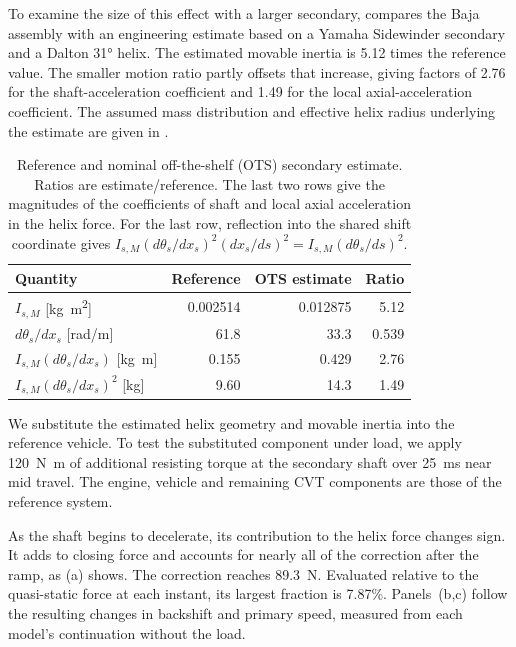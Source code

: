 \documentclass[11pt]{report}
\numberwithin{equation}{section}
\begin{document}
To examine the size of this effect with a larger secondary,
 compares the Baja assembly with an
engineering estimate based on a Yamaha Sidewinder secondary and a Dalton
\ang{31} helix. The estimated movable inertia is \num{5.12} times the
reference value. The smaller motion ratio partly offsets that increase,
giving factors of \num{2.76} for the shaft-acceleration coefficient and
\num{1.49} for the local axial-acceleration coefficient. The assumed mass
distribution and effective helix radius underlying the estimate are given
in .

\begin{table}[H]
 \centering\small
 \setlength{\tabcolsep}{4pt}
 \renewcommand{\arraystretch}{1.2}
 \begin{tabular}{@{}lrrr@{}}
  \toprule
  Quantity & Reference & OTS estimate & Ratio \\
  \midrule
  \(I_{s,M}\) [\si{kg.m^2}] & 0.002514 & 0.012875 & 5.12 \\
  \(d\theta_s/dx_s\) [\si{rad/m}] & 61.8 & 33.3 & 0.539 \\
  \(I_{s,M}(d\theta_s/dx_s)\) [\si{kg.m}] & 0.155 & 0.429 & 2.76 \\
  \(I_{s,M}(d\theta_s/dx_s)^2\) [\si{kg}] & 9.60 & 14.3 & 1.49 \\
  \bottomrule
 \end{tabular}
 \caption{Reference and nominal off-the-shelf (OTS) secondary estimate.
 Ratios are estimate/reference. The last two rows give the magnitudes of the coefficients of shaft and local axial acceleration in the helix force. For the last row, reflection into the shared shift coordinate gives \(I_{s,M}(d\theta_s/dx_s)^2(dx_s/ds)^2=I_{s,M}(d\theta_s/ds)^2\).}
 \label{tab:secondary_hardware_scale}
\end{table}

We substitute the estimated helix geometry and movable inertia into the
reference vehicle. To test the substituted component under load, we
apply \SI{120}{N.m} of additional resisting torque at the secondary shaft
over \SI{25}{ms} near mid travel. The engine, vehicle and remaining CVT
components are those of the reference system.

As the shaft begins to decelerate, its contribution to the helix force
changes sign. It adds to closing force and accounts for nearly all of the
correction after the ramp, as (a)
shows. The correction reaches \SI{89.3}{N}. Evaluated relative to the
quasi-static force at each instant, its largest fraction is
\num{7.87}\%. Panels~(b,c) follow the resulting changes in backshift and
primary speed, measured from each model's continuation without the load.
\end{document}
